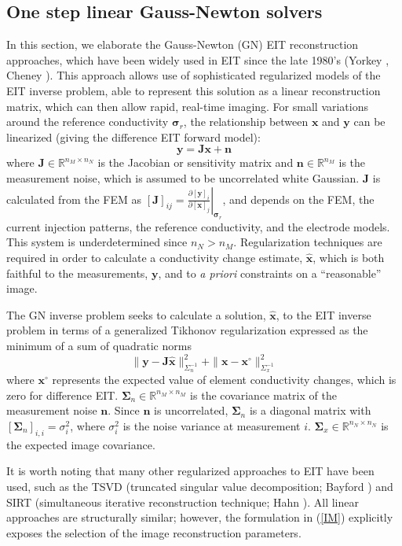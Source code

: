 \documentclass[12pt]{iopart}
\newcommand{\xB}{\mbox{$\mathbf{x}$}}
\newcommand{\xH}{\mbox{$\mathbf{\hat x}$}}
\newcommand{\nB}{\mbox{$\mathbf{n}$}}
\newcommand{\yB}{\mbox{$\mathbf{y}$}}
\newcommand{\JB}{\mbox{$\mathbf{J}$}}
\newcommand{\SG}{\mbox{${\boldsymbol \Sigma}$}}
\newcommand{\sG}{\mbox{${\boldsymbol \sigma}$}}
\begin{document}
\subsection{One step linear Gauss-Newton solvers}
\label{subsec:OSLGNS}

In this section, we elaborate the
Gauss-Newton (GN) EIT reconstruction approaches,
which have been
widely used in EIT since the late 1980's (Yorkey ,
Cheney ).
This approach allows use of sophisticated regularized models
of the EIT inverse problem, able to represent this
solution as a linear reconstruction matrix, which can then allow
rapid, real-time imaging.
For small variations around the reference
conductivity $\sG_r$, the relationship between $\xB$ and $\yB$ can
be linearized (giving the difference EIT forward model):
\begin{equation}\label{FM}
\yB=\JB\xB+\nB
\end{equation}
where
$\JB\in\mathbb{R}^{n_M\times n_N}$ is the Jacobian or sensitivity
matrix and $\nB\in\mathbb{R}^{n_M}$ is the measurement noise, which is
assumed to be uncorrelated white Gaussian. $\JB$ is calculated from
the FEM as
$[\JB]_{ij}=\left.
     \frac{\partial[\yB]_i}{\partial[\xB]_j}
          \right|_{\sG_r}$,
and depends on the FEM, the current injection patterns, the reference
conductivity, and the electrode models. This system is
underdetermined since $n_N > n_M$. 
Regularization techniques are required
in order to calculate a conductivity change
estimate, $\xH$, which is both
faithful to the measurements, $\yB$, and to
{\em a priori} constraints on a ``reasonable'' image.

The GN inverse problem seeks to
calculate a solution, $\xH$, to the EIT inverse problem
in terms of a generalized Tikhonov regularization 
expressed as the minimum of a sum of quadratic norms
\begin{equation}\label{IM}
 \|\yB-\JB\xH\|_{\Sigma_n^{-1}}^2 +
 \|\xB-\xB^\circ\|_{\Sigma_x^{-1}}^2
\end{equation}
where $\xB^\circ$ represents the expected value of element
conductivity changes, which is zero for  difference EIT.
$\SG_n\in\mathbb{R}^{n_M\times n_M}$ is
 the covariance matrix of the measurement noise $\nB$. Since
$\nB$ is uncorrelated, $\SG_n$ is a diagonal matrix with
$[\SG_n]_{i,i}=\sigma_i^2$, where $\sigma_i^2$ is the noise variance at
measurement $i$. $\SG_x\in\mathbb{R}^{n_N\times
n_N}$ is the expected image covariance.

It is worth noting that many other regularized approaches
to EIT have been used, such as the
TSVD (truncated singular value decomposition; Bayford )
and
SIRT (simultaneous iterative reconstruction technique; Hahn ).
All linear approaches are structurally similar; however,
the formulation in (\ref{IM})
explicitly exposes the selection of the image reconstruction
parameters.
\end{document}
